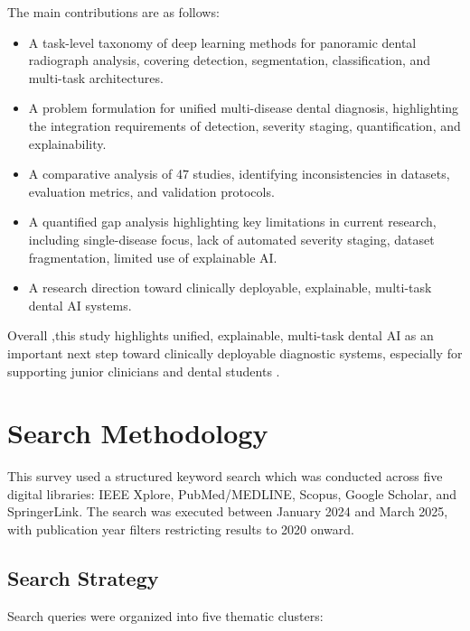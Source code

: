 \documentclass[conference]{IEEEtran}
\begin{document}
The main contributions are as follows:

\begin{itemize}
    \item A task-level taxonomy of deep learning methods for panoramic dental radiograph analysis, covering detection, segmentation, classification, and multi-task architectures.
    \item A problem formulation for unified multi-disease dental diagnosis, highlighting the integration requirements of detection, severity staging, quantification, and explainability.
    \item A comparative analysis of 47 studies, identifying inconsistencies in datasets, evaluation metrics, and validation protocols.
    \item A quantified gap analysis highlighting key limitations in current research, including single-disease focus, lack of automated severity staging, dataset fragmentation, limited use of explainable AI.
    \item A research direction toward clinically deployable, explainable, multi-task dental AI systems.
\end{itemize}

Overall ,this study highlights unified, explainable, multi-task dental AI as an important next step toward clinically deployable diagnostic systems, especially for supporting junior clinicians and dental students .





\section{Search Methodology}
\label{sec:methodology}

This survey used a structured keyword search which was conducted across five digital libraries: IEEE Xplore, PubMed/MEDLINE, Scopus, Google Scholar, and SpringerLink. The search was executed between January 2024 and March 2025, with publication year filters restricting results to 2020 onward.


\subsection{Search Strategy}

Search queries were organized into five thematic clusters:
\end{document}
